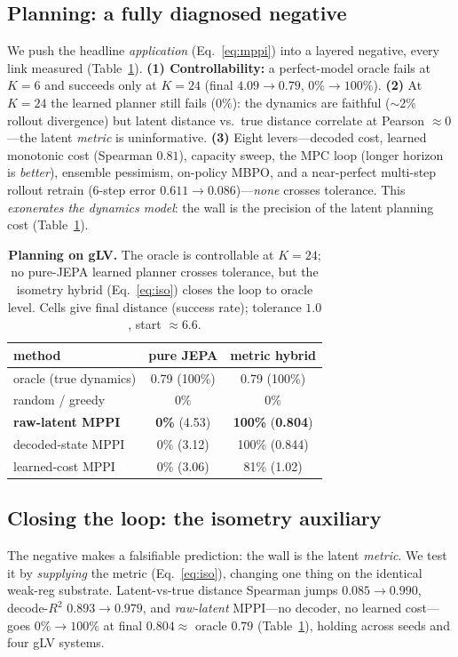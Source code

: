 \documentclass[10pt,twocolumn]{article}
\begin{document}
\subsection{Planning: a fully diagnosed negative}
\label{sec:planning}
We push the headline \emph{application} (Eq.~\ref{eq:mppi}) into a layered negative, every link measured
(Table~\ref{tab:planning}). \textbf{(1) Controllability:} a perfect-model oracle fails at $K{=}6$ and
succeeds only at $K{=}24$ (final $4.09\!\to\!0.79$, $0\%\!\to\!100\%$). \textbf{(2)} At $K{=}24$ the
learned planner still fails ($0\%$): the dynamics are faithful ($\sim\!2\%$ rollout divergence) but
latent distance vs.\ true distance correlate at Pearson $\approx 0$---the latent \emph{metric} is
uninformative. \textbf{(3)} Eight levers---decoded cost, learned monotonic cost (Spearman $0.81$),
capacity sweep, the MPC loop (longer horizon is \emph{better}), ensemble pessimism, on-policy MBPO, and a
near-perfect multi-step rollout retrain ($6$-step error $0.611\!\to\!0.086$)---\emph{none} crosses
tolerance. This \emph{exonerates the dynamics model}: the wall is the precision of the latent planning
cost (Table~\ref{tab:planning}).

\begin{table}[t]
\centering\small
\setlength{\tabcolsep}{5pt}
\caption{\textbf{Planning on gLV.} The oracle is controllable at $K{=}24$; no pure-JEPA learned planner
crosses tolerance, but the isometry hybrid (Eq.~\ref{eq:iso}) closes the loop to oracle level. Cells give
final distance (success rate); tolerance $1.0$, start $\approx 6.6$.}
\label{tab:planning}
\begin{tabular}{@{}lcc@{}}
\toprule
method & pure JEPA & metric hybrid \\
\midrule
oracle (true dynamics)        & 0.79 (100\%) & 0.79 (100\%) \\
random / greedy               & 0\% & 0\% \\
\textbf{raw-latent MPPI}      & \textbf{0\%} (4.53) & \textbf{100\%} (\textbf{0.804}) \\
decoded-state MPPI            & 0\% (3.12) & 100\% (0.844) \\
learned-cost MPPI             & 0\% (3.06) & 81\% (1.02) \\
\bottomrule
\end{tabular}
\end{table}

\subsection{Closing the loop: the isometry auxiliary}
The negative makes a falsifiable prediction: the wall is the latent \emph{metric}. We test it by
\emph{supplying} the metric (Eq.~\ref{eq:iso}), changing one thing on the identical weak-reg substrate.
Latent-vs-true distance Spearman jumps $0.085\!\to\!0.990$, decode-$R^2$ $0.893\!\to\!0.979$, and
\emph{raw-latent} MPPI---no decoder, no learned cost---goes $0\%\!\to\!100\%$ at final $0.804\approx$
oracle $0.79$ (Table~\ref{tab:planning}), holding across seeds and four gLV systems.
\end{document}
